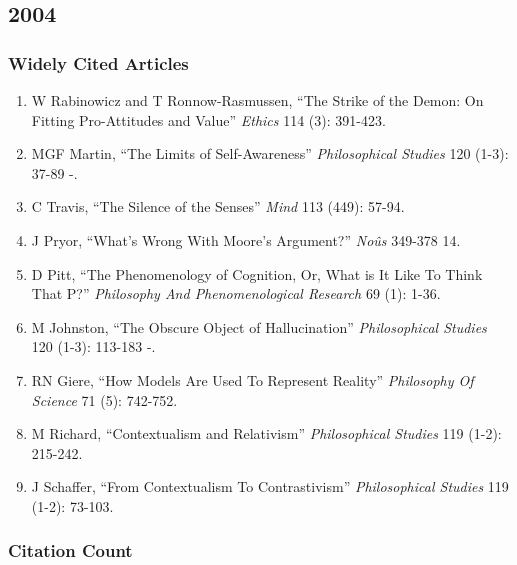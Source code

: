 \documentclass[
  10pt,
  letterpaper,
  DIV=11,
  numbers=noendperiod,
  twoside]{scrartcl}
\providecommand{\tightlist}{%
  \setlength{\itemsep}{0pt}\setlength{\parskip}{0pt}}\usepackage{longtable,booktabs,array}
\begin{document}
\newpage

\subsection{2004}\label{section-28}

\subsubsection*{Widely Cited Articles}\label{widely-cited-articles-28}

\begin{enumerate}
\def\labelenumi{\arabic{enumi}.}
\tightlist
\item
  W Rabinowicz and T Ronnow-Rasmussen, ``The Strike of the Demon: On
  Fitting Pro-Attitudes and Value'' \emph{Ethics} 114 (3): 391-423.
\item
  MGF Martin, ``The Limits of Self-Awareness'' \emph{Philosophical
  Studies} 120 (1-3): 37-89 -.
\item
  C Travis, ``The Silence of the Senses'' \emph{Mind} 113 (449): 57-94.
\item
  J Pryor, ``What's Wrong With Moore's Argument?'' \emph{Noûs} 349-378
  14.
\item
  D Pitt, ``The Phenomenology of Cognition, Or, What is It Like To Think
  That P?'' \emph{Philosophy And Phenomenological Research} 69 (1):
  1-36.
\item
  M Johnston, ``The Obscure Object of Hallucination''
  \emph{Philosophical Studies} 120 (1-3): 113-183 -.
\item
  RN Giere, ``How Models Are Used To Represent Reality''
  \emph{Philosophy Of Science} 71 (5): 742-752.
\item
  M Richard, ``Contextualism and Relativism'' \emph{Philosophical
  Studies} 119 (1-2): 215-242.
\item
  J Schaffer, ``From Contextualism To Contrastivism''
  \emph{Philosophical Studies} 119 (1-2): 73-103.
\end{enumerate}

\subsubsection*{Citation Count}\label{citation-count-28}
\end{document}
